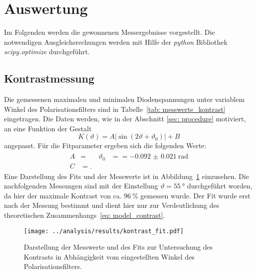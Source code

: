 \newpage
\section{Auswertung}
Im Folgenden werden die gewonnenen Messergebnisse vorgestellt. Die notwendigen Ausgleichsrechungen werden
mit Hilfe der \emph{python} Bibliothek \emph{scipy.optimize} durchgeführt.

\subsection{Kontrastmessung}
Die gemessenen maximalen und minimalen Diodenspannungen unter variablem Winkel des Polarisationsfilters sind in
Tabelle~\ref{tab: messwerte_kontrast} eingetragen.
Die Daten werden, wie in der Abschnitt \ref{sec: procedure} motiviert, an eine Funktion der Gestalt
\begin{equation}
    K(\vartheta) = A \left|\sin \left(2 \vartheta + \vartheta_0 \right)\right| + B
    \label{eq: model_contrast}
\end{equation}
angepasst. Für die Fitparameter ergeben sich die folgenden Werte:
\begin{align}
    \begin{aligned}
    A &=  \quad  & \vartheta_0 &=  = \SI{-0.092(21)}{\radian} \\
    C &= .
    \end{aligned}
\end{align}
Eine Darstellung des Fits und der Messwerte ist in Abbildung~\ref{fig: kontrast_fit} einzusehen.
Die nachfolgenden Messungen sind mit der Einstellung $\vartheta = \SI{55}{\degree}$ durchgeführt worden, da hier der maximale
Kontrast von ca. $\SI{96}{\percent}$ gemessen wurde. Der Fit wurde erst nach der Messung bestimmt und dient hier nur
zur Verdeutlichung des theoretischen Zusammenhangs~\eqref{eq: model_contrast}.



\begin{figure}
    \centering
    \texttt{[image: ../analysis/results/kontrast\_fit.pdf]}
    \caption{Darstellung der Messwerte und des Fits zur Untersuchung des Kontrasts in Abhängigkeit vom eingestellten Winkel des Polarisationsfilters.}
    \label{fig: kontrast_fit}
\end{figure}



